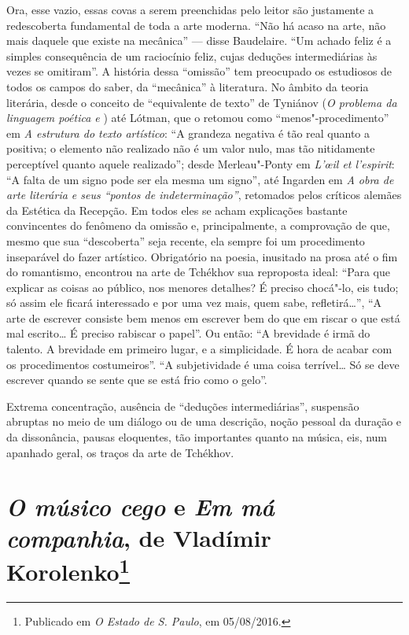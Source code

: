 Ora, esse vazio, essas covas a serem preenchidas pelo leitor são
justamente a redescoberta fundamental de toda a arte moderna.
``Não há acaso na arte, não mais daquele que existe na mecânica''
--- disse Baudelaire. ``Um achado feliz é a simples consequência
de um raciocínio feliz, cujas deduções intermediárias às vezes se
omitiram''. A história dessa ``omissão'' tem preocupado os estudiosos
de todos os campos do saber, da ``mecânica'' à literatura. No âmbito
da teoria literária, desde o conceito de ``equivalente de texto''
de Tyniánov (\emph{O problema da linguagem poética  e })
até Lótman, que o retomou como ``menos"-procedimento'' em \emph{A estrutura
do texto artístico}: ``A grandeza negativa é tão real quanto a positiva; o
elemento não realizado não é um valor nulo, mas tão nitidamente perceptível
quanto aquele realizado''; desde Merleau"-Ponty em \emph{L'œil et
l'espirit}: ``A falta de um signo pode ser ela mesma um signo'',
até Ingarden em \emph{A obra de arte literária e seus ``pontos de
indeterminação''}, retomados pelos críticos alemães da Estética da
Recepção. Em todos eles se acham explicações bastante convincentes
do fenômeno da omissão e, principalmente, a comprovação de que,
mesmo que sua ``descoberta'' seja recente, ela sempre foi um
procedimento inseparável do fazer artístico. Obrigatório na
poesia, inusitado na prosa até o fim do romantismo, encontrou na
arte de Tchékhov sua reproposta ideal: ``Para que explicar as
coisas ao público, nos menores detalhes? É preciso chocá"-lo, eis
tudo; só assim ele ficará interessado e por uma vez mais, quem
sabe, refletirá\ldots{}'', ``A arte de escrever consiste bem menos
em escrever bem do que em riscar o que está mal escrito\ldots{} É
preciso rabiscar o papel''. Ou então: ``A brevidade é irmã do
talento. A brevidade em primeiro lugar, e a simplicidade. É hora
de acabar com os procedimentos costumeiros''. ``A subjetividade é
uma coisa terrível\ldots{} Só se deve escrever quando se sente que
se está frio como o gelo''.

Extrema concentração, ausência de ``deduções intermediárias'',
suspensão abruptas no meio de um diálogo ou de uma descrição,
noção pessoal da duração e da dissonância, pausas eloquentes,
tão importantes quanto na música, eis, num apanhado geral, os
traços da arte de Tchékhov.

\chapter{\emph{O músico cego} e \emph{Em má companhia}, de
Vladímir Korolenko\footnote{Publicado em \emph{O Estado de S.
Paulo}, em 05/08/2016.}}

